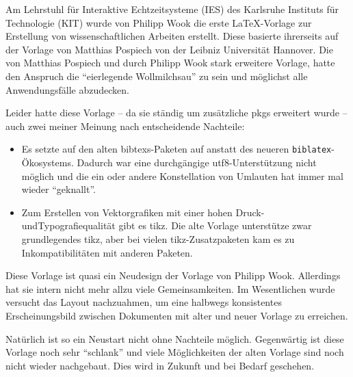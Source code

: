 
Am Lehrstuhl für Interaktive Echtzeitsysteme (IES) des Karlsruhe Instituts für
Technologie (KIT) wurde von Philipp Wook die erste LaTeX-Vorlage zur Erstellung
von wissenschaftlichen Arbeiten erstellt. Diese basierte ihrerseits auf der
Vorlage von Matthias Pospiech von der Leibniz Universität Hannover. Die von
Matthias Pospiech und durch Philipp Wook stark erweitere Vorlage, hatte den
Anspruch die \enquote{eierlegende Wollmilchsau} zu sein und möglichst alle
Anwendungsfälle abzudecken.

Leider hatte diese Vorlage -- da sie ständig um zusätzliche \glspl{pkg} erweitert
wurde -- auch zwei meiner Meinung nach entscheidende Nachteile:
\begin{itemize}
  \item Es setzte auf den alten \glspl{bibtex}-Paketen auf anstatt des neueren
	  \texttt{biblatex}-Ökosystems. Dadurch war eine durchgängige
		\gls{utf8}-Unterstützung nicht möglich und die ein oder andere Konstellation
		von Umlauten hat immer mal wieder \enquote{geknallt}.
		
  \item Zum Erstellen von Vektorgrafiken mit einer hohen
	Druck- undTypografiequalität gibt es \gls{tikz}. Die alte Vorlage unterstütze
	zwar 	grundlegendes \gls{tikz}, aber bei vielen \gls{tikz}-Zusatzpaketen kam
	es zu 	Inkompatibilitäten mit anderen Paketen.
\end{itemize}

Diese Vorlage ist quasi ein Neudesign der Vorlage von Philipp Wook. Allerdings
hat sie intern nicht mehr allzu viele Gemeinsamkeiten. Im Wesentlichen wurde
versucht das Layout nachzuahmen, um eine halbwegs konsistentes Erscheinungsbild
zwischen Dokumenten mit alter und neuer Vorlage zu erreichen.

Natürlich ist so ein Neustart nicht ohne Nachteile möglich. Gegenwärtig ist
diese Vorlage noch sehr \enquote{schlank} und viele Möglichkeiten der alten
Vorlage sind noch nicht wieder nachgebaut. Dies wird in Zukunft und bei Bedarf
geschehen.

